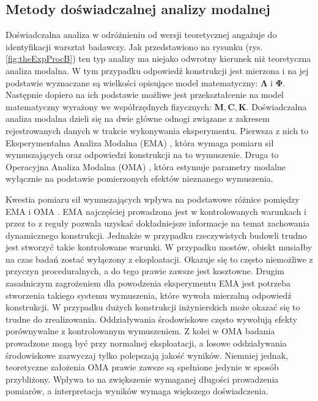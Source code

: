 \subsection{Metody doświadczalnej analizy modalnej}
Doświadczalna analiza w odróżnieniu od wersji teoretycznej angażuje do identyfikacji warsztat badawczy. Jak przedstawiono na rysunku (rys. \ref{fig:theExpProcB}) ten typ analizy ma niejako odwrotny kierunek niż teoretyczna analiza modalna. W tym przypadku odpowiedź konstrukcji jest mierzona i na jej podstawie wyznaczane są wielkości opisujące model matematyczny: $\mathbf{\Lambda}$ i $\mathbf{\Phi}$. Następnie dopiero na ich podstawie możliwe jest przekształcenie na model matematyczny wyrażony we współrzędnych fizycznych: $\mathbf{M}, \mathbf{C}, \mathbf{K}$. Doświadczalna analiza modalna dzieli się na dwie główne odnogi związane z zakresem rejestrowanych danych w trakcie wykonywania eksperymentu. Pierwsza z nich to Eksperymentalna Analiza Modalna (EMA) , która wymaga pomiaru sił wymuszających oraz odpowiedzi konstrukcji na to wymuszenie. Druga to Operacyjna Analiza Modalna (OMA) , która estymuje parametry modalne wyłącznie na podstawie pomierzonych efektów nieznanego wymuszenia. 

Kwestia pomiaru sił wymuszających wpływa na podstawowe różnice pomiędzy EMA i OMA \cite{Bien2007}. EMA najczęściej prowadzona jest w kontrolowanych warunkach i przez to z reguły pozwala uzyskać dokładniejsze informacje na temat zachowania dynamicznego konstrukcji. Jednakże w przypadku rzeczywistych budowli trudno jest stworzyć takie kontrolowane warunki. W przypadku mostów, obiekt musiałby na czas badań zostać wyłączony z eksploatacji. Okazuje się to często niemożliwe z przyczyn proceduralnych, a do tego prawie zawsze jest kosztowne. Drugim zasadniczym zagrożeniem dla powodzenia eksperymentu EMA jest potrzeba stworzenia takiego systemu wymuszenia, które wywoła mierzalną odpowiedź konstrukcji. W przypadku dużych konstrukcji inżynierskich może okazać się to trudne do zrealizowania. Oddziaływania środowiskowe często wywołują efekty porównywalne z kontrolowanym wymuszeniem. Z kolei w OMA badania prowadzone mogą być przy normalnej eksploatacji, a losowe oddziaływania środowiskowe zazwyczaj tylko polepszają jakość wyników. Niemniej jednak, teoretyczne założenia OMA prawie zawsze są spełnione jedynie w sposób przybliżony. Wpływa to na zwiększenie wymaganej długości prowadzenia pomiarów, a interpretacja wyników wymaga większego doświadczenia. 


